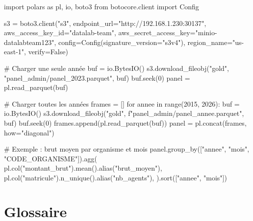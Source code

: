\documentclass[12pt,a4paper,french]{report}
\begin{document}
\begin{codebox}
import polars as pl, io, boto3
from botocore.client import Config

s3 = boto3.client("s3", endpoint\_url="http://192.168.1.230:30137",
                  aws\_access\_key\_id="datalab-team",
                  aws\_secret\_access\_key="minio-datalabteam123",
                  config=Config(signature\_version="s3v4"),
                  region\_name="us-east-1", verify=False)

# Charger une seule année
buf = io.BytesIO()
s3.download\_fileobj("gold", "panel\_admin/panel\_2023.parquet", buf)
buf.seek(0)
panel = pl.read\_parquet(buf)

# Charger toutes les années
frames = []
for annee in range(2015, 2026):
    buf = io.BytesIO()
    s3.download\_fileobj("gold", f"panel\_admin/panel\_{annee}.parquet", buf)
    buf.seek(0)
    frames.append(pl.read\_parquet(buf))
panel = pl.concat(frames, how="diagonal")

# Exemple : brut moyen par organisme et mois
panel.group\_by(["annee", "mois", "CODE\_ORGANISME"]).agg(
    pl.col("montant\_brut").mean().alias("brut\_moyen"),
    pl.col("matricule").n\_unique().alias("nb\_agents"),
).sort(["annee", "mois"])
\end{codebox}

\chapter{Glossaire}
\end{document}

